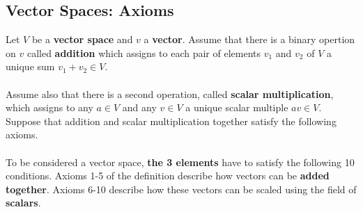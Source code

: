 \documentclass[10pt]{article}
\begin{document}
\subsection*{Vector Spaces: Axioms}
Let $V$ be a \textbf{vector space} and $v$ a \textbf{vector}.  Assume that there is a binary opertion on $v$ called \textbf{addition} which assigns to each pair of elements $v_1$ and $v_2$ of $V$ a unique sum $v_1 + v_2 \in V$.\\\\
Assume also that there is a second operation, called \textbf{scalar multiplication}, which assigns to any $a \in V$ and any $v \in V$ a unique scalar multiple $av \in V$.  Suppose that addition and scalar multiplication together satisfy the following axioms.\\\\
To be considered a vector space, \textbf{the 3 elements} have to satisfy the following 10 conditions.  Axioms 1-5 of the definition describe how vectors can be \textbf{added together}.  Axioms 6-10 describe how these vectors can be scaled using the field of \textbf{scalars}.
\end{document}
